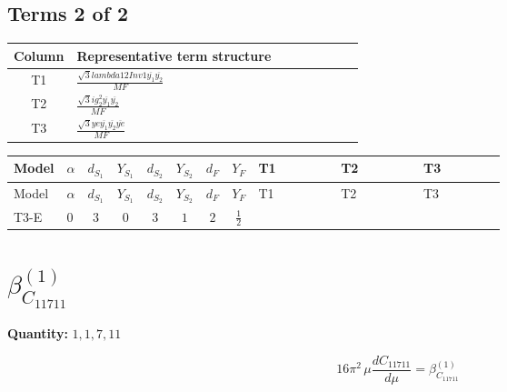 \documentclass[8pt]{article}
\begin{document}
\begin{landscape}
\subsection*{Terms 2 of 2}
\begin{center}
\begin{tabular}{@{}c >{\raggedright\arraybackslash}p{0.82\linewidth}@{}}
\toprule
Column & Representative term structure \\
\midrule
T1 & \(\displaystyle \frac{\sqrt{3} lambda12Inv1 \overline{y_{1}} \overline{y_{2}}}{MF}\) \\
\midrule
T2 & \(\displaystyle \frac{\sqrt{3} i g_{2}^{2} \overline{y_{1}} \overline{y_{2}}}{MF}\) \\
\midrule
T3 & \(\displaystyle \frac{\sqrt{3} ye \overline{y_{1}} \overline{y_{2}} \overline{ye}}{MF}\) \\
\midrule
\bottomrule
\end{tabular}
\end{center}
\smallskip
\tiny
\begin{longtable}{@{}llcccccc >{\raggedright\arraybackslash}p{0.21\linewidth} >{\raggedright\arraybackslash}p{0.21\linewidth} >{\raggedright\arraybackslash}p{0.21\linewidth}@{}}
\toprule
Model & $\alpha$ & $d_{S_1}$ & $Y_{S_1}$ & $d_{S_2}$ & $Y_{S_2}$ & $d_F$ & $Y_F$ & T1 & T2 & T3 \\
\midrule
\endfirsthead
\toprule
Model & $\alpha$ & $d_{S_1}$ & $Y_{S_1}$ & $d_{S_2}$ & $Y_{S_2}$ & $d_F$ & $Y_F$ & T1 & T2 & T3 \\
\midrule
\endhead
T3-E & $0$ & $3$ & $0$ & $3$ & $1$ & $2$ & $\frac{1}{2}$ & \scriptsize\adjustbox{max width=\linewidth}{$\begin{gathered} \frac{\sqrt{3} lambda12Inv1 \overline{y_{1}} \overline{y_{2}}}{6 MF}\end{gathered}$} & \scriptsize\adjustbox{max width=\linewidth}{$\begin{gathered} - \frac{\sqrt{3} i g_{2}^{2} \overline{y_{1}} \overline{y_{2}}}{6 MF}\end{gathered}$} & \scriptsize\adjustbox{max width=\linewidth}{$\begin{gathered} \frac{\sqrt{3} ye \overline{y_{1}} \overline{y_{2}} \overline{ye}}{12 MF}\end{gathered}$} \\
\midrule
\bottomrule
\end{longtable}
\clearpage
\section*{$\beta_{C_{11711}}^{(1)}$}
\noindent\textbf{Quantity: }$\mathrm{1,1,7,11}$\par\smallskip
\[16\pi^2\,\mu\frac{d C_{11711}}{d\mu}=\beta_{C_{11711}}^{(1)}\]

\end{landscape}
\end{document}
